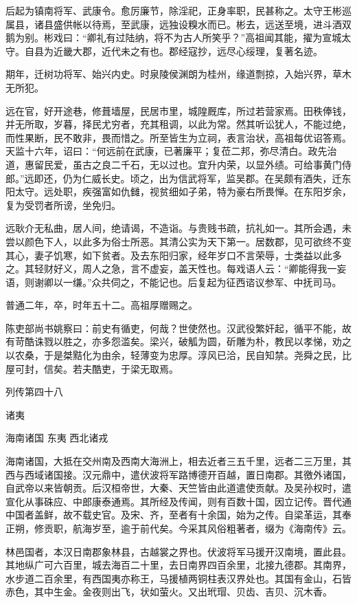 \documentclass[12pt,UTF8]{ctexbook}
\begin{document}
后起为镇南将军、武康令。愈厉廉节，除淫祀，正身率职，民甚称之。太守王彬巡属县，诸县盛供帐以待焉，至武康，远独设糗水而已。彬去，远送至境，进斗酒双鹅为别。彬戏曰：“卿礼有过陆纳，将不为古人所笑乎？”高祖闻其能，擢为宣城太守。自县为近畿大郡，近代未之有也。郡经寇抄，远尽心绥理，复著名迹。

期年，迁树功将军、始兴内史。时泉陵侯渊朗为桂州，缘道剽掠，入始兴界，草木无所犯。

远在官，好开途巷，修葺墙屋，民居市里，城隍厩库，所过若营家焉。田秩俸钱，并无所取，岁暮，择民尤穷者，充其租调，以此为常。然其听讼犹人，不能过绝，而性果断，民不敢非，畏而惜之。所至皆生为立祠，表言治状，高祖每优诏答焉。天监十六年，诏曰：“何远前在武康，已著廉平；复莅二邦，弥尽清白。政先治道，惠留民爱，虽古之良二千石，无以过也。宜升内荣，以显外绩。可给事黄门侍郎。”远即还，仍为仁威长史。顷之，出为信武将军，监吴郡。在吴颇有酒失，迁东阳太守。远处职，疾强富如仇雠，视贫细如子弟，特为豪右所畏惮。在东阳岁余，复为受罚者所谤，坐免归。

远耿介无私曲，居人间，绝请谒，不造诣。与贵贱书疏，抗礼如一。其所会遇，未尝以颜色下人，以此多为俗士所恶。其清公实为天下第一。居数郡，见可欲终不变其心，妻子饥寒，如下贫者。及去东阳归家，经年岁口不言荣辱，士类益以此多之。其轻财好义，周人之急，言不虚妄，盖天性也。每戏语人云：“卿能得我一妄语，则谢卿以一缣。”众共伺之，不能记也。后复起为征西谘议参军、中抚司马。

普通二年，卒，时年五十二。高祖厚赠赐之。

陈吏部尚书姚察曰：前史有循吏，何哉？世使然也。汉武役繁奸起，循平不能，故有苛酷诛戮以胜之，亦多怨滥矣。梁兴，破觚为圆，斫雕为朴，教民以孝悌，劝之以农桑，于是桀黠化为由余，轻薄变为忠厚。淳风已洽，民自知禁。尧舜之民，比屋可封，信矣。若夫酷吏，于梁无取焉。





列传第四十八

诸夷

海南诸国 东夷 西北诸戎

海南诸国，大抵在交州南及西南大海洲上，相去近者三五千里，远者二三万里，其西与西域诸国接。汉元鼎中，遣伏波将军路博德开百越，置日南郡。其徼外诸国，自武帝以来皆朝贡。后汉桓帝世，大秦、天竺皆由此道遣使贡献。及吴孙权时，遣宣化从事硃应、中郎康泰通焉。其所经及传闻，则有百数十国，因立记传。晋代通中国者盖鲜，故不载史官。及宋、齐，至者有十余国，始为之传。自梁革运，其奉正朔，修贡职，航海岁至，逾于前代矣。今采其风俗粗著者，缀为《海南传》云。

林邑国者，本汉日南郡象林县，古越裳之界也。伏波将军马援开汉南境，置此县。其地纵广可六百里，城去海百二十里，去日南界四百余里，北接九德郡。其南界，水步道二百余里，有西国夷亦称王，马援植两铜柱表汉界处也。其国有金山，石皆赤色，其中生金。金夜则出飞，状如萤火。又出玳瑁、贝齿、吉贝、沉木香。
\end{document}
